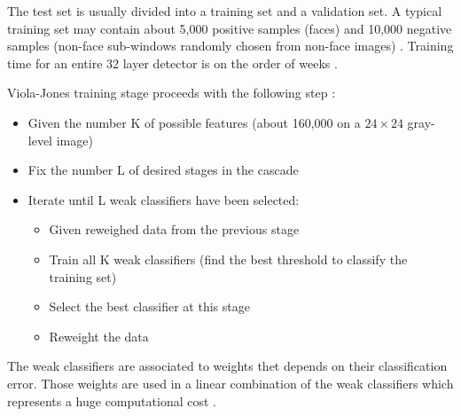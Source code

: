 \vspace{\baselineskip}
\noindent The test set is usually divided into a training set and a validation set. A typical training set may contain about 5,000 positive samples (faces) and 10,000 negative samples (non-face sub-windows randomly chosen from non-face images) \cite{DIN08}. Training time for an entire 32 layer detector is on the order of weeks \cite{VIO01}.
\newline

\noindent Viola-Jones training stage proceeds with the following step \cite{DIN08}:

\begin{itemize}
  \item Given the number K of possible features (about 160,000 on a $ 24\times24 $ gray-level image)
  \item Fix the number L of desired stages in the cascade
  \item Iterate until L weak classifiers have been selected:
  \begin{itemize}
  	\item Given reweighed data from the previous stage
	\item Train all K weak classifiers (find the best threshold to classify the training set)
	\item Select the best classifier at this stage
	\item Reweight the data
  \end{itemize}
\end{itemize}

\noindent The weak classifiers are associated to weights thet depends on their classification error. Those weights are used in a linear combination of the weak classifiers which represents a huge computational cost \cite{DIN08}.
\newline





